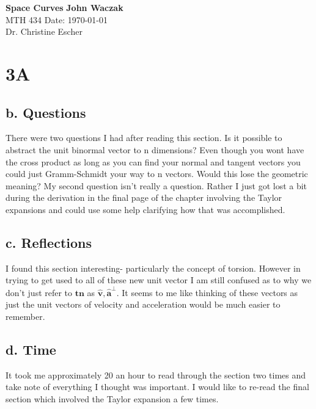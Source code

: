 \documentclass[a4paper, 11pt]{article}
\begin{document}
\noindent
\large\textbf{Space Curves} \hfill \textbf{John Waczak} \\
\normalsize MTH 434 \hfill  Date: \today \\
Dr. Christine Escher \\

\section*{3A}
	\subsection*{b. Questions}
	There were two questions I had after reading this section. Is it possible to abstract the unit binormal vector to n dimensions? Even though you wont have the cross product as long as you can find your normal and tangent vectors you could just Gramm-Schmidt your way to n vectors. Would this lose the geometric meaning? 
	My second question isn't really a question. Rather I just got lost a bit during the derivation in the final page of the chapter involving the Taylor expansions and could use some help clarifying how that was accomplished. 
	
	\subsection*{c. Reflections}
	I found this section interesting- particularly the concept of torsion. However in trying to get used to all of these new unit vector I am still confused as to why we don't just refer to $\mathbf{t} \mathbf{n}$ as $\hat{\mathbf{v}}, \hat{\mathbf{a}}^{\perp}$. It seems to me like thinking of these vectors as just the unit vectors of velocity and acceleration would be much easier to remember. 
	
	\subsection*{d. Time}
	It took me approximately 20 an hour to read through the section two times and take note of everything I thought was important. I would like to re-read the final section which involved the Taylor expansion a few times. 
\end{document}
